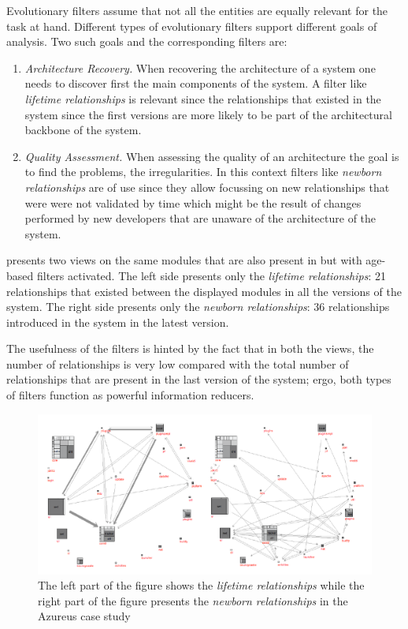\documentclass[preprint,12pt]{elsarticle}
\begin{document}
Evolutionary filters assume that not all the entities are equally relevant for the task at hand. Different types of evolutionary filters support different goals of analysis. Two such goals and the corresponding filters are:

\begin{enumerate}

\item {\em Architecture Recovery.} When recovering the architecture of a system one needs to discover first the main components of the system. A filter like {\em lifetime relationships} is relevant since the relationships that existed in the system since the first versions are more likely to be part of the architectural backbone of the system. %

\item {\em Quality Assessment.} When assessing the quality of an architecture the goal is to find the problems, the irregularities. In this context filters like {\em newborn relationships} are of use since they allow focussing on new relationships that were were not validated by time which might be the result of changes performed by new developers that are unaware of the architecture of the system. %

\end{enumerate}

 presents two views on the same modules that are also present in  but with age-based filters activated. The left side presents only the {\em lifetime relationships}: 21 relationships that existed between the displayed modules in all the versions of the system. The right side presents only the {\em newborn relationships}: 36 relationships introduced in the system in the latest version. 

The usefulness of the filters is hinted by the fact that in both the views, the number of relationships is very low compared with the total number of relationships that are present in the last version of the system; ergo, both types of filters function as powerful information reducers.

\begin{figure}
\begin{center}
\includegraphics[width=\linewidth]{Architecture-LifetimeVsRecent}
\caption{The left part of the figure shows the {\em lifetime relationships} while the right part of the figure presents the {\em newborn relationships} in the Azureus case study}
\end{center}
\end{figure}
\end{document}
